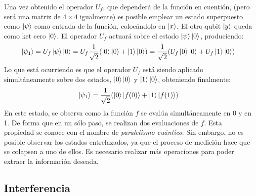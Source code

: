Una vez obtenido el operador $U_f$, que dependerá de la función en cuentión, 
(pero será una matriz de $4 \times 4$ igualmente) es posible emplear un estado 
superpuesto como $\ket{\psi}$ como entrada de la función, colocándolo en 
$\ket{x}$. El otro qubit $\ket{y}$ queda como ket cero $\ket{0}$.
El operador $U_f$ actuará sobre el estado $\ket{\psi}\ket{0}$, produciendo:
$$ \ket{\psi_{1}} = U_f\ket{\psi}\ket{0} = U_f\frac{1}{\sqrt 2}(\ket{0}\ket{0} + 
\ket{1}\ket{0}) =
\frac{1}{\sqrt 2}(U_f\ket{0}\ket{0} + U_f\ket{1}\ket{0})$$
%
Lo que está ocurriendo es que el operador $U_f$ está siendo aplicado 
simultáneamente sobre dos estados, $\ket{0}\ket{0}$ y $\ket{1}\ket{0}$, 
obteniendo finalmente:
%
$$ \ket{\psi_{1}} = \frac{1}{\sqrt 2}(\ket{0}\ket{f(0)} + \ket{1}\ket{f(1)}) $$
%
En este estado, se observa como la función $f$ se evalúa simultáneamente en 0 y 
en 1. De forma que en un sólo paso, se realizan dos evaluaciones de $f$. Esta 
propiedad se conoce con el nombre de \textit{paralelismo cuántico}.
Sin embargo, no es posible observar los estados entrelazados, ya que el proceso 
de medición hace que se colapsen a uno de ellos. Es necesario realizar más 
operaciones para poder extraer la información deseada.

\subsection{Interferencia}

